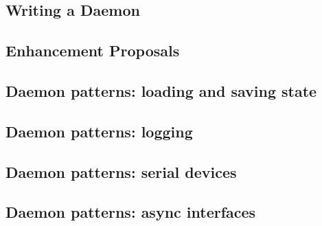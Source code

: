 \subsection{Writing a Daemon}

\subsection{Enhancement Proposals}

\subsection{Daemon patterns: loading and saving state}

\subsection{Daemon patterns: logging}

\subsection{Daemon patterns: serial devices}

\subsection{Daemon patterns: async interfaces}

\clearpage
